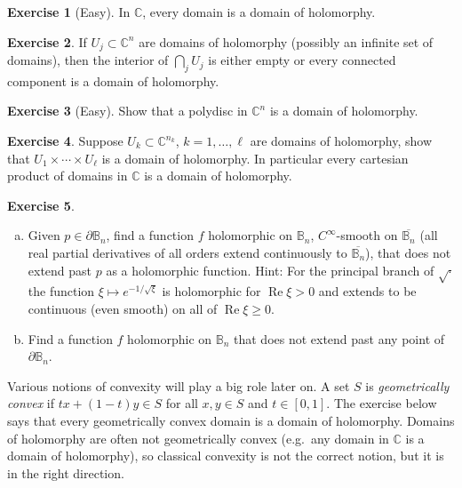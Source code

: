 \documentclass[12pt,openany]{book}
\renewcommand{\Re}{\operatorname{Re}}
\newcommand{\C}{{\mathbb{C}}}
\newcommand{\bB}{{\mathbb{B}}}
\newcommand{\myindex}[1]{#1\index{#1}}
\theoremstyle{plain}
\theoremstyle{remark}
\theoremstyle{definition}
\newenvironment{exbox}{%
    \def\FrameCommand{\vrule width 1pt \relax\hspace{10pt}}%
    \MakeFramed {\advance \hsize -\width \FrameRestore}%
}{%
    \endMakeFramed
}
\newenvironment{exparts}{%
    \leavevmode\begin{enumerate}[a),noitemsep,topsep=0pt,parsep=0pt,partopsep=0pt]
}{%
    \end{enumerate}
}
\theoremstyle{exercise}
\newtheorem{exercise}{Exercise}[section]
\theoremstyle{example}
\begin{document}
\begin{exbox}
\begin{exercise}[Easy]
In $\C$, every domain is a domain of holomorphy.
\end{exercise}

\begin{exercise}
If $U_j \subset \C^n$ are domains of holomorphy (possibly an infinite set of
domains), then the interior of
$\bigcap_{j} U_j$
is either empty or every connected component is a domain of holomorphy.
\pagebreak[1]
\end{exercise}

\begin{exercise}[Easy]
Show that a polydisc in $\C^n$ is a domain of holomorphy.
\end{exercise}

\begin{exercise}
Suppose $U_k \subset \C^{n_k}$, $k=1,\ldots,\ell$ are domains of holomorphy,
show that
$U_1 \times \cdots \times U_\ell$ is a domain of holomorphy.
In particular every cartesian product of domains in $\C$ is a domain of
holomorphy.
\end{exercise}

\begin{exercise}
\begin{exparts}
\item
Given $p \in \partial \bB_n$, find a function $f$ holomorphic on
$\bB_n$,
$C^\infty$-smooth on $\overline{\bB_n}$ (all real partial derivatives of
all orders extend
continuously to $\overline{\bB_n}$), that does not extend past $p$
as a holomorphic function.
Hint: For the principal branch of $\sqrt{\cdot}$ the function $\xi \mapsto
e^{-1/\sqrt{\xi}}$ is holomorphic for $\Re \xi > 0$ and extends to
be continuous (even smooth) on all of $\Re \xi \geq 0$.
\item
Find a function $f$ holomorphic on $\bB_n$
that does not extend past any point of
$\partial \bB_n$.
\end{exparts}
\end{exercise}
\end{exbox}

Various notions of convexity will play a big role later on.
A set $S$ is \emph{\myindex{geometrically convex}}
if $t x + (1-t)y \in S$ 
for all $x,y \in S$ and $t \in [0,1]$.
The exercise below
says that every geometrically convex domain is a domain of holomorphy.
Domains of holomorphy are often not geometrically convex
(e.g.\ any domain in $\C$ is a domain of holomorphy),
so classical convexity is not the correct notion, but it is
in the right direction.
\end{document}
